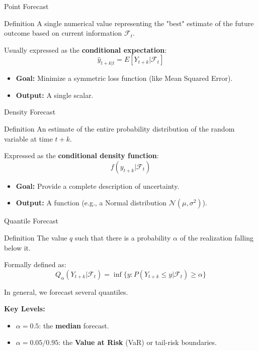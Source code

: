 \begin{frame}{Point Forecast}
    \begin{block}{Definition}
        A single numerical value representing the "best" estimate of the future outcome based on current information $\mathcal{F}_t$.
    \end{block}

    \vspace{0.5cm}
    Usually expressed as the \textbf{conditional expectation}:
    $$\hat{y}_{t+k|t} = E[Y_{t+k} | \mathcal{F}_t]$$

    \begin{itemize}
        \item \textbf{Goal:} Minimize a symmetric loss function (like Mean Squared Error).
        \item \textbf{Output:} A single scalar.
    \end{itemize}
\end{frame}


\begin{frame}{Density Forecast}
    \begin{block}{Definition}
        An estimate of the entire probability distribution of the random variable at time $t+k$.
    \end{block}

    \vspace{0.5cm}
    Expressed as the \textbf{conditional density function}:
    $$f(y_{t+k} | \mathcal{F}_t)$$

    \begin{itemize}
        \item \textbf{Goal:} Provide a complete description of uncertainty.
        \item \textbf{Output:} A function (e.g., a Normal distribution $\mathcal{N}(\mu, \sigma^2)$).
    \end{itemize}
\end{frame}


\begin{frame}{Quantile Forecast}
    \begin{block}{Definition}
        The value $q$ such that there is a probability $\alpha$ of the realization falling below it.
    \end{block}

    \vspace{0.3cm}
    Formally defined as:
    $$Q_{\alpha}(Y_{t+k} | \mathcal{F}_t) = \inf \{ y : P(Y_{t+k} \le y | \mathcal{F}_t) \ge \alpha \}$$

    In general, we forecast several quantiles.

    \textbf{Key Levels:}
    \begin{itemize}
        \item $\alpha = 0.5$: the \textbf{median} forecast.
        \item $\alpha = 0.05 / 0.95$: the \textbf{Value at Risk }(VaR) or tail-risk boundaries.
    \end{itemize}

    

\end{frame}

